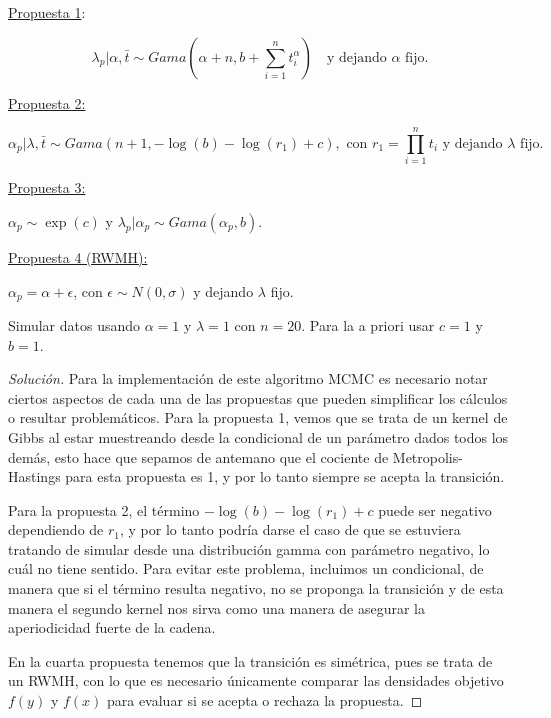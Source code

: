 \documentclass{article}
\begin{document}
\begin{enumerate}
    \underline{Propuesta 1}:

    \[ \lambda_p|\alpha, \bar t \sim Gama \left(\alpha + n , b +\sum_{i=1}^n 
    t^\alpha_i \right) \quad \text{y dejando $\alpha$ fijo.} \]

    \underline{Propuesta 2:}

    \[\alpha_p|\lambda, \bar t \sim Gama (n + 1 , -\log(b) - \log(r_1) + c), 
    \text{ con } r_1 = \prod_{i=1}^n t_i \text{ y dejando $\lambda$ fijo. }\]
    
    \underline{Propuesta 3:}
    
    $\alpha_p \sim \exp(c)$ y $\lambda_p|\alpha_p \sim Gama(\alpha_p, b)$.

    \underline{Propuesta 4 (RWMH):} 
    
    $\alpha_p = \alpha + \epsilon$, con $\epsilon \sim N (0, \sigma)$ y dejando 
    $\lambda$ fijo. 
    
    Simular datos usando $\alpha = 1$ y $\lambda = 1$ con $n = 20$. 
    Para la a priori usar $c = 1$ y $b = 1$.

    \begin{proof}[Solución]
        Para la implementación de este algoritmo MCMC es necesario notar ciertos
        aspectos de cada una de las propuestas que pueden simplificar los cálculos
        o resultar problemáticos. Para la propuesta 1, vemos que se trata de un 
        kernel de Gibbs al estar muestreando desde la condicional de un parámetro
        dados todos los demás, esto hace que sepamos de antemano que el cociente de
        Metropolis-Hastings para esta propuesta es 1, y por lo tanto siempre se acepta
        la transición. 
        
        Para la propuesta 2, el término $-\log(b)-\log(r_1)+c$ puede 
        ser negativo dependiendo de $r_1$, y por lo tanto podría darse el caso de que
        se estuviera tratando de simular desde una distribución gamma con parámetro
        negativo, lo cuál no tiene sentido. Para evitar este problema, incluimos un
        condicional, de manera que si el término resulta negativo, no se proponga la 
        transición y de esta manera el segundo kernel nos sirva como una manera de
        asegurar la aperiodicidad fuerte de la cadena. 

        En la cuarta propuesta tenemos que la transición es simétrica, pues se trata de
        un RWMH, con lo que es necesario únicamente comparar las densidades objetivo 
        $f(y)$ y $f(x)$ para evaluar si se acepta o rechaza la propuesta.


\end{proof}
\end{enumerate}
\end{document}
